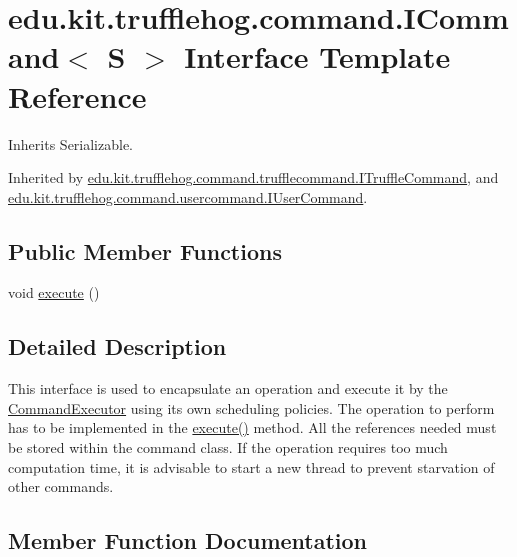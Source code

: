 \hypertarget{interfaceedu_1_1kit_1_1trufflehog_1_1command_1_1_i_command}{}\section{edu.\+kit.\+trufflehog.\+command.\+I\+Command$<$ S $>$ Interface Template Reference}
\label{interfaceedu_1_1kit_1_1trufflehog_1_1command_1_1_i_command}


Inherits Serializable.



Inherited by \hyperlink{interfaceedu_1_1kit_1_1trufflehog_1_1command_1_1trufflecommand_1_1_i_truffle_command}{edu.\+kit.\+trufflehog.\+command.\+trufflecommand.\+I\+Truffle\+Command}, and \hyperlink{interfaceedu_1_1kit_1_1trufflehog_1_1command_1_1usercommand_1_1_i_user_command}{edu.\+kit.\+trufflehog.\+command.\+usercommand.\+I\+User\+Command}.

\subsection*{Public Member Functions}
\begin{DoxyCompactItemize}
\item 
void \hyperlink{interfaceedu_1_1kit_1_1trufflehog_1_1command_1_1_i_command_a2a845dff6b1463c6184d7198ea79bc28}{execute} ()
\end{DoxyCompactItemize}


\subsection{Detailed Description}
This interface is used to encapsulate an operation and execute it by the \hyperlink{}{Command\+Executor} using its own scheduling policies. The operation to perform has to be implemented in the \hyperlink{interfaceedu_1_1kit_1_1trufflehog_1_1command_1_1_i_command_a2a845dff6b1463c6184d7198ea79bc28}{execute()} method. All the references needed must be stored within the command class. If the operation requires too much computation time, it is advisable to start a new thread to prevent starvation of other commands. 

\subsection{Member Function Documentation}
\hypertarget{interfaceedu_1_1kit_1_1trufflehog_1_1command_1_1_i_command_a2a845dff6b1463c6184d7198ea79bc28}{}
